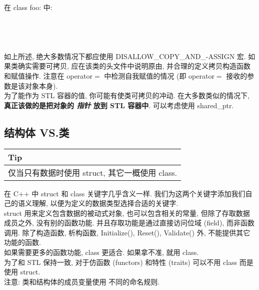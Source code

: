 \documentclass[a4paper,11pt,CJK]{article}
\begin{document}
\begin{CJK}{UTF8}{gbsn}
{}
\\
\\
\\
\indent 在 class foo: 中: \\
\\
\\
\\
\\
\indent 如上所述, 绝大多数情况下都应使用 DISALLOW\_COPY\_AND\_-ASSIGN 宏. 如果类确实需要可拷贝, 应在该类的头文件中说明原由, 并合理的定义拷贝构造函数和赋值操作. 注意在 operator$=$ 中检测自我赋值的情况 (即 operator$=$ 接收的参数是该对象本身).\\
\indent 为了能作为 STL 容器的值, 你可能有使类可拷贝的冲动. 在大多数类似的情况下, \textbf{真正该做的是把对象的 \emph{指针} 放到 STL 容器中}. 可以考虑使用 shared\_ptr.

\subsection{结构体 VS.类}
\begin{table}[htbp]
\flushleft
\begin{tabular}{p{400pt}}
\toprule
\rowcolor[gray]{.8} Tip \\
\midrule
仅当只有数据时使用 struct, 其它一概使用 class.\\
\bottomrule
\end{tabular}
\end{table}
在 C++ 中 struct 和 class 关键字几乎含义一样. 我们为这两个关键字添加我们自己的语义理解, 以便为定义的数据类型选择合适的关键字.\\
\indent struct 用来定义包含数据的被动式对象, 也可以包含相关的常量, 但除了存取数据成员之外, 没有别的函数功能. 并且存取功能是通过直接访问位域 (field), 而非函数调用. 除了构造函数, 析构函数, Initialize(), Reset(), Validate() 外, 不能提供其它功能的函数.\\
\indent 如果需要更多的函数功能, class 更适合. 如果拿不准, 就用 class.\\
\indent 为了和 STL 保持一致, 对于仿函数 (functors) 和特性 (traits) 可以不用 class 而是使用 struct.\\
\indent 注意: 类和结构体的成员变量使用 不同的命名规则.


\end{CJK}
\end{document}
